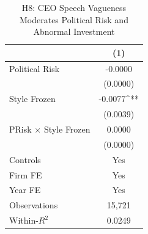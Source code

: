 \begin{table}[htbp]
\centering
\caption{H8: CEO Speech Vagueness Moderates Political Risk and Abnormal Investment}
\label{tab:h8_political_risk}
\small
\begin{tabular}{lc}
\toprule
 & (1) \\
\midrule
Political Risk & -0.0000 \\
 & (0.0000) \\
Style Frozen & -0.0077^{**} \\
 & (0.0039) \\
PRisk $\times$ Style Frozen & 0.0000 \\
 & (0.0000) \\
\midrule
Controls & Yes \\
Firm FE  & Yes \\
Year FE  & Yes \\
\midrule
Observations & 15,721 \\
Within-$R^2$ & 0.0249 \\
\bottomrule
\end{tabular}
\end{table}